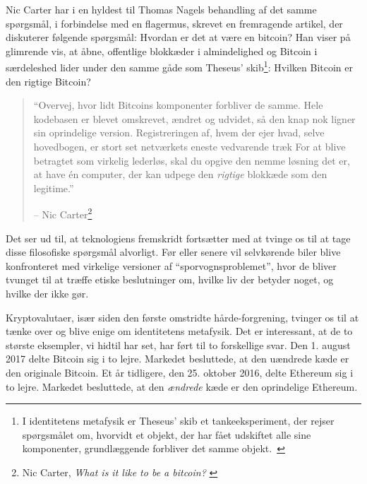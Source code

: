 \documentclass[paper=6in:9in,pagesize=pdftex,
               headinclude=on,footinclude=on,12pt]{scrbook}
\begin{document}
Nic Carter har i en hyldest til Thomas Nagels behandling af det samme spørgsmål, i forbindelse med en flagermus, skrevet en fremragende artikel, der diskuterer følgende spørgsmål: Hvordan er det at være en bitcoin? Han viser på glimrende vis, at åbne, offentlige blokkæder i almindelighed og Bitcoin i særdeleshed lider under den samme gåde som Theseus' skib\footnote{I identitetens metafysik er Theseus' skib et tankeeksperiment, der rejser spørgsmålet om, hvorvidt et objekt, der har fået udskiftet alle sine komponenter, grundlæggende forbliver det samme objekt.~\cite{wiki:theseus}}: Hvilken Bitcoin er den rigtige Bitcoin?\begin{quotation}\begin{samepage} \enquote{Overvej, hvor lidt Bitcoins komponenter forbliver de samme. Hele kodebasen er blevet omskrevet, ændret og udvidet, så den knap nok ligner sin oprindelige version. \href{...}{} Registreringen af, hvem der ejer hvad, selve hovedbogen, er stort set netværkets eneste vedvarende træk \href{...}{} For at blive betragtet som virkelig lederløs, skal du opgive den nemme løsning det er, at have \'en computer, der kan udpege den \textit{rigtige} blokkæde som den legitime.} \begin{flushright} -- Nic Carter\footnote{Nic Carter, \textit{What is it like to be a bitcoin?} \cite{bitcoin-identity}}
\end{flushright}\end{samepage}\end{quotation}

Det ser ud til, at teknologiens fremskridt fortsætter med at tvinge os til at tage disse filosofiske spørgsmål alvorligt. Før eller senere vil selvkørende biler blive konfronteret med virkelige versioner af \enquote{sporvognsproblemet}, hvor de bliver tvunget til at træffe etiske beslutninger om, hvilke liv der betyder noget, og hvilke der ikke gør.

Kryptovalutaer, især siden den første omstridte hårde-forgrening, tvinger os til at tænke over og blive enige om identitetens metafysik. Det er interessant, at de to største eksempler, vi hidtil har set, har ført til to forskellige svar. Den 1. august 2017 delte Bitcoin sig i to lejre. Markedet besluttede, at den uændrede kæde er den originale Bitcoin. Et år tidligere, den 25. oktober 2016, delte Ethereum sig i to lejre. Markedet besluttede, at den \textit{ændrede} kæde er den oprindelige Ethereum.
\end{document}
